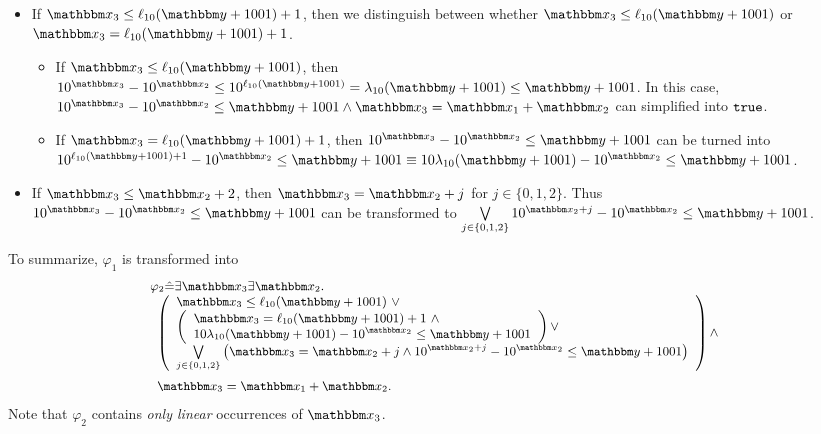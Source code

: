 \begin{itemize}
\item If $\ivarx_3 \le \ell_{10}(\ivary+1001)+1$, then we distinguish between whether $\ivarx_3 \le \ell_{10}(\ivary+1001)$ or  $\ivarx_3 = \ell_{10}(\ivary+1001)+1$. 
\begin{itemize}
\item If $\ivarx_3 \le \ell_{10}(\ivary+1001)$, then $10^{\ivarx_3} - 10^{\ivarx_2} \le 10^{\ell_{10}(\ivary+1001)} = \lambda_{10}(\ivary+1001) \le \ivary + 1001$. In this case, $10^{\ivarx_3} - 10^{\ivarx_2} \le \ivary + 1001 \wedge \ivarx_3 = \ivarx_1 + \ivarx_2$ can simplified into $\mathtt{true}$.
%
\item If $\ivarx_3 = \ell_{10}(\ivary+1001)+1$, then $10^{\ivarx_3} - 10^{\ivarx_2} \le \ivary + 1001$ can be turned into $10^{\ell_{10}(\ivary+1001)+1} - 10^{\ivarx_2} \le \ivary + 1001 \equiv 10 \lambda_{10}(\ivary+1001) - 10^{\ivarx_2} \le \ivary + 1001 $.
\end{itemize} 
%
\item If $\ivarx_3 \le \ivarx_2 + 2$, then $\ivarx_3 = \ivarx_2 + j$ for $j \in \{0,1,2\}$. Thus $10^{\ivarx_3} - 10^{\ivarx_2} \le \ivary + 1001$ can be transformed to $\bigvee \limits_{j \in \{0,1,2\}} 10^{\ivarx_2 + j} - 10^{\ivarx_2} \le \ivary + 1001$.
\end{itemize}

To summarize, $\varphi_1$ is transformed into 
\[
\small
\begin{array}{l}
\varphi_2 \Def \exists \ivarx_3 \exists \ivarx_2. \\
\begin{array}{l}
\vspace{2mm}
\left(
\begin{array}{l}
\ivarx_3 \le \ell_{10}(\ivary+1001)\ \vee \\
\left(
\begin{array}{l}
\ivarx_3 = \ell_{10}(\ivary+1001)+1\ \wedge \\
10 \lambda_{10}(\ivary+1001) - 10^{\ivarx_2} \le \ivary + 1001 
\end{array}
\right) \vee \\
%
 \bigvee \limits_{j \in \{0,1,2\}}  \left(\ivarx_3 = \ivarx_2 +j \wedge 10^{\ivarx_2 + j} - 10^{\ivarx_2} \le \ivary + 1001\right)
\end{array}
\right) 
\wedge \\
 \ivarx_3 = \ivarx_1 + \ivarx_2.
 \end{array}
\end{array}
\]
Note that $\varphi_2$ contains \emph{only linear} occurrences of $\ivarx_3$.

